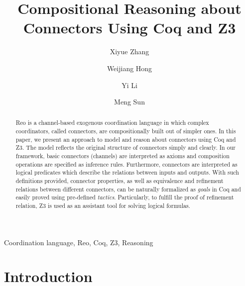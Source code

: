 \documentclass[preprint,3p]{elsarticle}
\begin{document}
\begin{frontmatter}

\title{Compositional Reasoning about Connectors Using Coq and Z3}


\author{Xiyue Zhang}
\author{Weijiang Hong}
\author{Yi Li}
\author{Meng Sun}
\address{LMAM \& DI, School of Mathematical Science, Peking University, Beijing, China}

\begin{abstract}
Reo is a channel-based exogenous coordination language in which complex coordinators, called connectors, are compositionally built out of simpler ones. In this paper, we present an approach to model and reason about connectors using Coq and Z3. %
The model reflects the original structure of connectors simply and clearly. In our framework, basic connectors (channels) are interpreted as axioms and composition operations are specified as inference rules. Furthermore, connectors are interpreted as logical predicates which describe the relations
between inputs and outputs. With such definitions provided, connector properties, as well as equivalence and refinement relations between different connectors, can be naturally formalized as \emph{goals} in Coq and easily proved using pre-defined \emph{tactics}. Particularly, to fulfill the proof of refinement relation, Z3 is used as an assistant tool for solving logical formulas.

\end{abstract}
\begin{keyword}
Coordination language, Reo, Coq, Z3, Reasoning
\end{keyword}
\end{frontmatter}
\section{Introduction}\label{sec:introduction}
\end{document}
